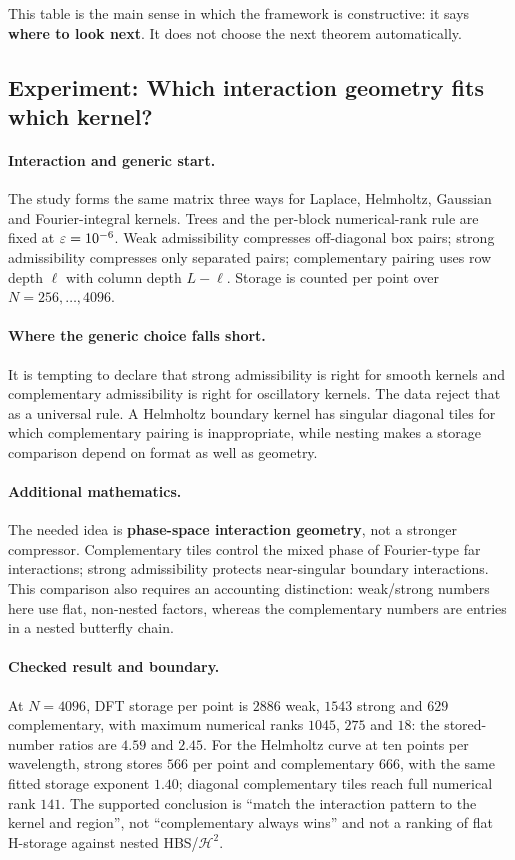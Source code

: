 This table is the main sense in which the framework is constructive: it says \textbf{where to look next}. It does not choose the next theorem automatically.

\subsection{Experiment: Which interaction geometry fits which kernel?}
\label{exp:e1}
\paragraph{Interaction and generic start.} The study forms the same matrix three ways for Laplace, Helmholtz, Gaussian and Fourier-integral kernels. Trees and the per-block numerical-rank rule are fixed at $\varepsilon=10^{-6}$. Weak admissibility compresses off-diagonal box pairs; strong admissibility compresses only separated pairs; complementary pairing uses row depth $\ell$ with column depth $L-\ell$. Storage is counted per point over $N=256,\ldots,4096$.

\paragraph{Where the generic choice falls short.} It is tempting to declare that strong admissibility is right for smooth kernels and complementary admissibility is right for oscillatory kernels. The data reject that as a universal rule. A Helmholtz boundary kernel has singular diagonal tiles for which complementary pairing is inappropriate, while nesting makes a storage comparison depend on format as well as geometry.

\paragraph{Additional mathematics.} The needed idea is \textbf{phase-space interaction geometry}, not a stronger compressor. Complementary tiles control the mixed phase of Fourier-type far interactions; strong admissibility protects near-singular boundary interactions. This comparison also requires an accounting distinction: weak/strong numbers here use flat, non-nested factors, whereas the complementary numbers are entries in a nested butterfly chain.

\paragraph{Checked result and boundary.} At $N=4096$, DFT storage per point is $2886$ weak, $1543$ strong and $629$ complementary, with maximum numerical ranks $1045$, $275$ and $18$: the stored-number ratios are $4.59$ and $2.45$. For the Helmholtz curve at ten points per wavelength, strong stores $566$ per point and complementary $666$, with the same fitted storage exponent $1.40$; diagonal complementary tiles reach full numerical rank $141$. The supported conclusion is ``match the interaction pattern to the kernel and region'', not ``complementary always wins'' and not a ranking of flat H-storage against nested HBS/$\mathcal H^2$.

